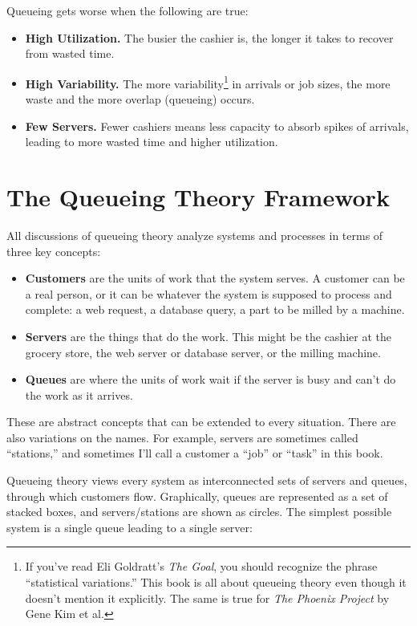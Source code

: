 \documentclass{vivid_layout_pdf}
\begin{document}
Queueing gets worse when the following are true:

\begin{itemize}
\item {\bfseries High Utilization.} The busier the cashier is, the longer it takes to recover from wasted time.
\item {\bfseries High Variability.} The more variability\footnote{If you've read Eli Goldratt's {\itshape The Goal}, you should recognize the phrase ``statistical variations.'' This book is all about queueing theory even though it doesn't mention it explicitly. The same is true for {\itshape The Phoenix Project} by Gene Kim et al.} in arrivals or job sizes, the more waste and the more overlap (queueing) occurs.
\item {\bfseries Few Servers.} Fewer cashiers means less capacity to absorb spikes of arrivals, leading to more wasted time and higher utilization.
\end{itemize}

\section{The Queueing Theory Framework}

All discussions of queueing theory analyze systems and processes in terms of three key concepts:

\begin{itemize}
\item {\bfseries Customers} are the units of work that the system serves. A customer can be a real person, or it can be whatever the system is supposed to process and complete: a web request, a database query, a part to be milled by a machine.
\item {\bfseries Servers} are the things that do the work. This might be the cashier at the grocery store, the web server or database server, or the milling machine.
\item {\bfseries Queues} are where the units of work wait if the server is busy and can't do the work as it arrives.
\end{itemize}

These are abstract concepts that can be extended to every situation. There are also variations on the names. For example, servers are sometimes called ``stations,'' and sometimes I'll call a customer a ``job'' or ``task'' in this book.

Queueing theory views every system as interconnected sets of servers and queues, through which customers flow. Graphically, queues are represented as a set of stacked boxes, and servers/stations are shown as circles.  The simplest possible system is a single queue leading to a single server:
\end{document}
